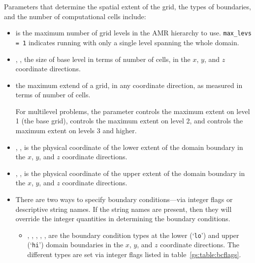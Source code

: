 Parameters that determine the spatial extent of the grid, 
the types of boundaries, and the number of computational cells include:
\begin{itemize}

\item {} is the maximum number of grid levels in the AMR
  hierarchy to use.  {\tt max\_levs = 1} indicates running with only a
  single level spanning the whole domain.

\item {}, ,  the size of
  base level in terms of number of cells, in the $x$, $y$, and $z$
  coordinate directions.

\item {} the maximum extend of a grid, in any
  coordinate direction, as measured in terms of number of cells.

  For multilevel problems, the parameter 
  controls the maximum extent on level 1 (the base
  grid),  controls the maximum extent on
  level 2, and  controls the maximum extent on
  levels 3 and higher.

\item {}, ,  is
  the physical coordinate of the lower extent of the domain boundary
  in the $x$, $y$, and $z$ coordinate directions.

\item {}, ,  is
  the physical coordinate of the upper extent of the domain boundary
  in the $x$, $y$, and $z$ coordinate directions.

\item There are two ways to specify boundary conditions---via integer flags
      or descriptive string names.  If the string names are present,
      then they will override the integer quantities in determining
      the boundary conditions.

   \begin{itemize}

   \item {}, , , , ,  are the
      boundary condition types at the lower (`{\tt lo}') and upper
      (`{\tt hi}') domain boundaries in the $x$, $y$, and $z$
      coordinate directions.  The different types are set via integer
      flags listed in table~\ref{gs:table:bcflags}.


\end{itemize}
\end{itemize}
